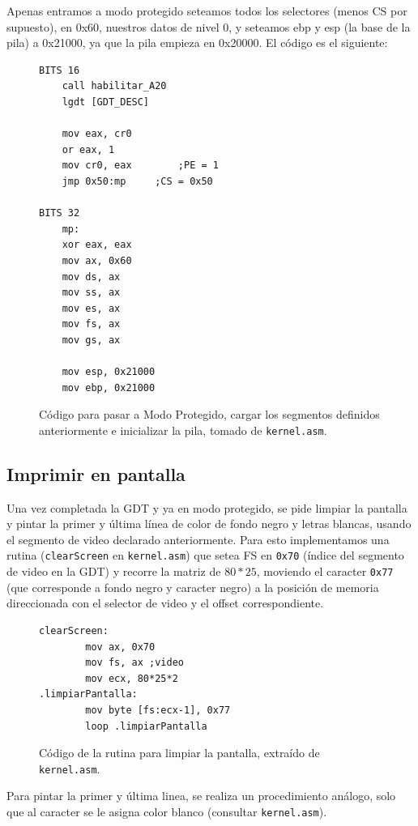\documentclass[10pt, a4paper]{article}
\begin{document}
Apenas entramos a modo protegido seteamos todos los selectores (menos CS por supuesto), en 0x60, nuestros datos de nivel 0, y seteamos ebp y esp (la base de la pila) a 0x21000, ya que la pila empieza en 0x20000. El código es el siguiente:
\begin{figure}[!h]
\begin{center}
\begin{verbatim}
BITS 16
	call habilitar_A20
	lgdt [GDT_DESC]
	
	mov eax, cr0
	or eax, 1		
	mov cr0, eax		;PE = 1
	jmp 0x50:mp		;CS = 0x50
		
BITS 32
    mp:
	xor eax, eax
	mov ax, 0x60
	mov ds, ax
	mov ss, ax
	mov es, ax
	mov fs, ax
	mov gs, ax
		
	mov esp, 0x21000 
	mov ebp, 0x21000 
\end{verbatim}
\caption{Código para pasar a Modo Protegido, cargar los segmentos definidos anteriormente e inicializar la pila, tomado de \texttt{kernel.asm}.}
\end{center}
\end{figure}
\newpage
\subsection{Imprimir en pantalla}
Una vez completada la GDT y ya en modo protegido, se pide limpiar la pantalla y pintar la primer y última línea de color de fondo negro y letras blancas, usando
el segmento de video declarado anteriormente.
Para esto implementamos una rutina (\texttt{clearScreen} en \texttt{kernel.asm}) que setea FS en \texttt{0x70} (índice del segmento de video en la GDT) y recorre
la matriz de $80*25$, moviendo el caracter \texttt{0x77} (que corresponde a fondo negro y caracter negro) a la posición de memoria direccionada con el selector de video 
y el offset correspondiente.

\begin{figure}[!h]
\begin{center}
\begin{verbatim}
clearScreen:		
		mov ax, 0x70
		mov fs, ax ;video
		mov ecx, 80*25*2
.limpiarPantalla:
		mov byte [fs:ecx-1], 0x77
		loop .limpiarPantalla
\end{verbatim}
\caption{Código de la rutina para limpiar la pantalla, extraído de \texttt{kernel.asm}.}
\end{center}
\end{figure}
Para pintar la primer y última linea, se realiza un procedimiento análogo, solo que al caracter se le asigna color blanco (consultar \texttt{kernel.asm}). 
		
\end{document}

